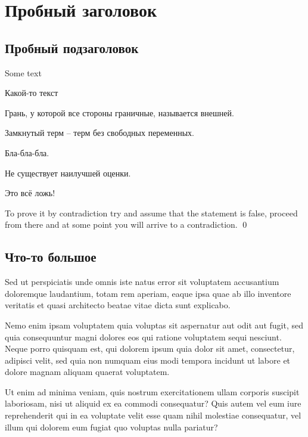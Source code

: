 \documentclass[17pt, a4paper]{extarticle}
\begin{document}
\section{Пробный заголовок}


\subsection{Пробный подзаголовок}

Some text

Какой-то текст
\begin{define}
Грань, у которой все стороны граничные, называется внешней.
\end{define}

\begin{define}
Замкнутый терм -- терм без свободных переменных.
\end{define}

\begin{lemma}
Бла-бла-бла.
\end{lemma}

\begin{theorem}
	Не существует наилучшей оценки.
\end{theorem}

\noproof

\begin{remarkthm}
Это всё ложь!
\end{remarkthm}

\proofstart

To prove it by contradiction try and assume that the statement is false,
proceed from there and at some point you will arrive to a contradiction. \qed

\subsection{Что-то большое}

\begin{define}
Sed ut perspiciatis unde omnis iste natus error sit voluptatem accusantium doloremque laudantium, totam rem aperiam, eaque ipsa quae ab illo inventore
veritatis et quasi architecto beatae vitae dicta sunt explicabo.

Nemo enim ipsam voluptatem quia voluptas sit aspernatur aut odit aut fugit, sed quia
consequuntur magni dolores eos qui ratione voluptatem sequi nesciunt. Neque porro quisquam est, qui dolorem ipsum quia dolor sit amet, consectetur,
adipisci velit, sed quia non numquam eius modi tempora incidunt ut labore et dolore magnam aliquam quaerat voluptatem.

Ut enim ad minima veniam, quis
nostrum exercitationem ullam corporis suscipit laboriosam, nisi ut aliquid ex ea commodi consequatur? Quis autem vel eum iure reprehenderit qui in ea
voluptate velit esse quam nihil molestiae consequatur, vel illum qui dolorem eum fugiat quo voluptas nulla pariatur?
\end{define}
\end{document}
